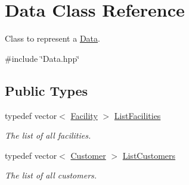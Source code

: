 \hypertarget{classData}{\section{\-Data \-Class \-Reference}
\label{classData}
}


\-Class to represent a {\ttfamily \hyperlink{classData}{\-Data}}.  




{\ttfamily \#include \char`\"{}\-Data.\-hpp\char`\"{}}

\subsection*{\-Public \-Types}
\begin{DoxyCompactItemize}
\item 
typedef vector$<$ \hyperlink{classFacility}{\-Facility} $>$ \hyperlink{classData_a63d34805405ed1b64c868cd5ef7267ef}{\-List\-Facilities}
\begin{DoxyCompactList}\small\item\em \-The list of all facilities. \end{DoxyCompactList}\item 
typedef vector$<$ \hyperlink{classCustomer}{\-Customer} $>$ \hyperlink{classData_a3252caf2ec3ffeb972647e9e2f005bea}{\-List\-Customers}
\begin{DoxyCompactList}\small\item\em \-The list of all customers. \end{DoxyCompactList}\end{DoxyCompactItemize}
